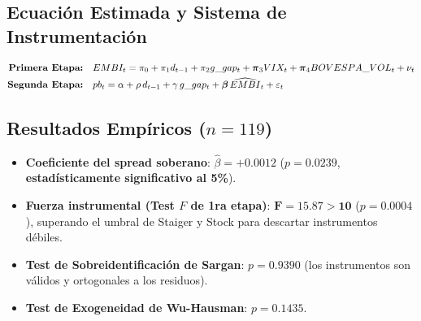 \documentclass[11pt,a4paper]{article}
\begin{document}
\subsection{Ecuación Estimada y Sistema de Instrumentación}
\begin{align}
\text{\textbf{Primera Etapa:}} \quad & EMBI_t = \pi_0 + \pi_1 d_{t-1} + \pi_2 g\_gap_t + \boldsymbol{\pi}_3 VIX_t + \boldsymbol{\pi}_4 BOVESPA\_VOL_t + \nu_t \\
\text{\textbf{Segunda Etapa:}} \quad & pb_t = \alpha + \rho \, d_{t-1} + \gamma \, g\_gap_t + \boldsymbol{\beta} \, \widehat{EMBI}_t + \varepsilon_t
\end{align}

\subsection{Resultados Empíricos ($n=119$)}
\begin{itemize}[leftmargin=1.5em]
    \item \textbf{Coeficiente del spread soberano}: $\hat{\beta} = \mathbf{+0.0012}$ ($p = \mathbf{0.0239}$, \textbf{estadísticamente significativo al 5\%}).
    \item \textbf{Fuerza instrumental (Test $F$ de 1ra etapa)}: $\mathbf{F = 15.87 > 10}$ ($p = 0.0004$), superando el umbral de Staiger y Stock para descartar instrumentos débiles.
    \item \textbf{Test de Sobreidentificación de Sargan}: $p = \mathbf{0.9390}$ (los instrumentos son válidos y ortogonales a los residuos).
    \item \textbf{Test de Exogeneidad de Wu-Hausman}: $p = 0.1435$.
\end{itemize}
\end{document}
